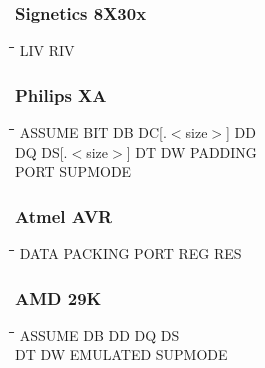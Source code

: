 \subsubsection{Signetics 8X30x}
{\tt\begin{tabbing}
\hspace{3cm}\=\hspace{3cm}\=\hspace{3cm}\=\hspace{3cm}\=\kill
LIV        \> RIV         \\   
\end{tabbing}}

\subsubsection{Philips XA}
{\tt\begin{tabbing}
\hspace{3cm}\=\hspace{3cm}\=\hspace{3cm}\=\hspace{3cm}\=\kill
ASSUME     \> BIT         \> DB          \> DC[.$<$size$>$] \> DD \\
DQ         \> DS[.$<$size$>$] \> DT      \> DW          \> PADDING \\
PORT       \> SUPMODE \\
\end{tabbing}}

\subsubsection{Atmel AVR}
{\tt\begin{tabbing}
\hspace{3cm}\=\hspace{3cm}\=\hspace{3cm}\=\hspace{3cm}\=\kill
DATA       \> PACKING     \> PORT        \> REG         \> RES \\
\end{tabbing}}

\subsubsection{AMD 29K}
{\tt\begin{tabbing}
\hspace{3cm}\=\hspace{3cm}\=\hspace{3cm}\=\hspace{3cm}\=\kill
ASSUME     \> DB          \> DD          \> DQ          \> DS \\
DT         \> DW          \> EMULATED    \> SUPMODE \\
\end{tabbing}}

